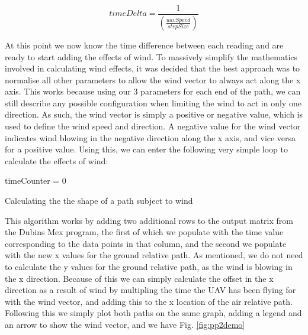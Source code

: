 \begin{equation}
	timeDelta = \frac{1}{(\frac{uavSpeed}{stepSize})}
\end{equation}

At this point we now know the time difference between each reading and are ready to start adding the effects of wind. To massively simplify the mathematics involved in calculating wind effects, it was decided that the best approach was to normalise all other parameters to allow the wind vector to always act along the x axis. This works because using our 3 parameters for each end of the path, we can still describe any possible configuration when limiting the wind to act in only one direction. As such, the wind vector is simply a positive or negative value, which is used to define the wind speed and direction. A negative value for the wind vector indicates wind blowing in the negative direction along the x axis, and vice versa for a positive value. Using this, we can enter the following very simple loop to calculate the effects of wind:

\begin{center}
\begin{minipage}{\linewidth}
\begin{algorithm}[H]
\label{pp2Algorithm}
\SetAlgoLined
	timeCounter = 0\;
\caption{Calculating the the shape of a path subject to wind}
\end{algorithm}
\end{minipage}
\end{center}

This algorithm works by adding two additional rows to the output matrix from the Dubins Mex program, the first of which we populate with the time value corresponding to the data points in that column, and the second we populate with the new x values for the ground relative path. As mentioned, we do not need to calculate the y values for the ground relative path, as the wind is blowing in the x direction. Because of this we can simply calculate the offset in the x direction as a result of wind by multipling the time the UAV has been flying for with the wind vector, and adding this to the x location of the air relative path. Following this we simply plot both paths on the same graph, adding a legend and an arrow to show the wind vector, and we have Fig. \ref{fig:pp2demo}

